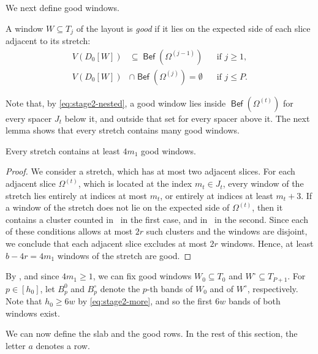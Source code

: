 \documentclass[fontsize=12pt,leading=14pt]{fullpaper}
\DeclareMathOperator{\Bef}{\mathsf{Bef}}
\begin{document}
We next define good windows.

\begin{definition}\label{def:good-window}
  A window $W\subseteq T_j$ of the layout is \emph{good} if it lies on the expected side of each slice adjacent to its stretch:
  \[
    \begin{aligned}
      V(D_0[W])&\subseteq\Bef(\Omega^{(j-1)})&&\text{if }j\ge1,\\
      V(D_0[W])&\cap\Bef(\Omega^{(j)})=\emptyset&&\text{if }j\le P.
    \end{aligned}
  \]
\end{definition}

Note that, by \eqref{eq:stage2-nested}, a good window lies inside $\Bef(\Omega^{(t)})$ for every spacer $J_t$ below it, and outside that set for every spacer above it.
The next lemma shows that every stretch contains many good windows.

\begin{lemma}\label{lem:good-windows}
  Every stretch contains at least $4m_1$ good windows.
\end{lemma}

\begin{proof}
  We consider a stretch, which has at most two adjacent slices.
  For each adjacent slice $\Omega^{(t)}$, which is located at the index $m_t\in J_t$, every window of the stretch lies entirely at indices at most $m_t$, or entirely at indices at least $m_t+3$.
  If a window of the stretch does not lie on the expected side of $\Omega^{(t)}$, then it contains a cluster counted in~ in the first case, and in~ in the second.
  Since each of these conditions allows at most $2r$ such clusters and the windows are disjoint, we conclude that each adjacent slice excludes at most $2r$ windows.
  Hence, at least $b-4r=4m_1$ windows of the stretch are good.
\end{proof}

By , and since $4m_1\ge1$, we can fix good windows $W_0\subseteq T_0$ and $W^\circ\subseteq T_{P+1}$.
For $p\in[h_0]$, let $B^0_p$ and $B^\circ_p$ denote the $p$-th bands of $W_0$ and of $W^\circ$, respectively.
Note that $h_0\ge6w$ by \eqref{eq:stage2-more}, and so the first $6w$ bands of both windows exist.

We can now define the slab and the good rows.
In the rest of this section, the letter $a$ denotes a row.
\end{document}
